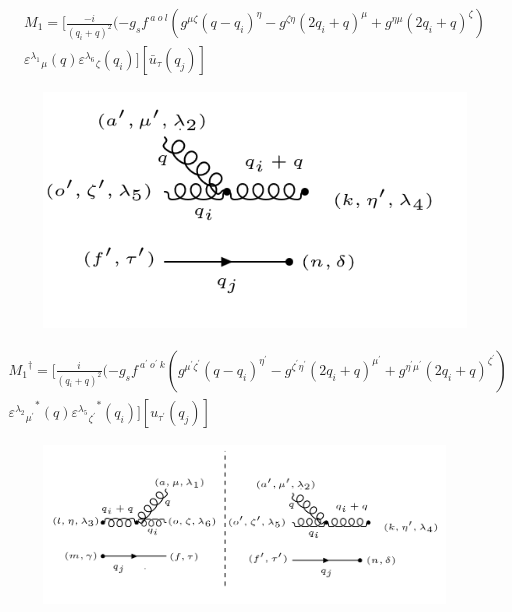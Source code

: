 \begin{equation}
\begin{split}
M_1=[\frac{-i}{(q_i +q)^2}(-g_s f^{\:a\:o\:l}(g^{{\mu}{\zeta}}(q-q_i)^{\eta}-g^{{\zeta}{\eta}}(2q_i +q)^{\mu}+g^{{\eta}{\mu}}(2q_i +q)^{\zeta})\\
{\varepsilon^{\lambda_1}}_{\mu} (q) {\varepsilon^{\lambda_6}}_{\zeta} (q_i)][\bar{u}_{\tau}(q_j)]
\end{split}
\end{equation}
\begin{figure}[ht!]
\centering
\includegraphics[scale=0.7]{images/ggqM1dagger.png}
\end{figure}
\begin{equation}
\begin{split}
{M_1}^{\dagger}=[\frac{i}{(q_i +q)^2}(-g_s f^{\:a^{\prime}\:o^{\prime}\:k}(g^{{{\mu}^{\prime}}{{\zeta}^{\prime}}}(q-q_i)^{{\eta}^{\prime}}-g^{{{\zeta}^{\prime}}{{\eta}^{\prime}}}(2q_i +q)^{{\mu}^{\prime}}+g^{{{\eta}^{\prime}}{{\mu}^{\prime}}}(2q_i +q)^{{\zeta}^{\prime}})\\
{{\varepsilon^{\lambda_2}}_{{\mu}^{\prime}}}^* (q) {{\varepsilon^{\lambda_5}}_{{\zeta}^{\prime}}}^* (q_i)][{u}_{{\tau}^{\prime}}(q_j)]
\end{split}
\end{equation}
\begin{figure}[ht!]
\centering
\includegraphics[width=0.95\textwidth]{images/ggqM1squer.png}
\end{figure}

